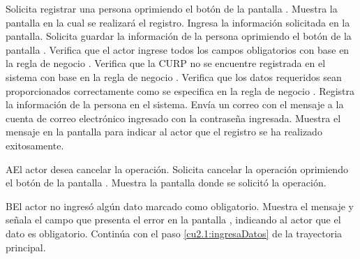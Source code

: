  \begin{UCtrayectoria}
    \UCpaso[\UCactor] Solicita registrar una persona oprimiendo el botón  de la pantalla .
    \UCpaso[\UCsist] Muestra la pantalla  en la cual se realizará el registro. 
    \UCpaso[\UCactor] Ingresa la información solicitada en la pantalla. \label{cu2.1:ingresaDatos}
    \UCpaso[\UCactor] Solicita guardar la información de la persona oprimiendo el botón  de la pantalla .  
    \UCpaso[\UCsist] Verifica que el actor ingrese todos los campos obligatorios con base en la regla de negocio  . 
    \UCpaso[\UCsist] Verifica que la CURP no se encuentre registrada en el sistema con base en la regla de negocio  . 
    \UCpaso[\UCsist] Verifica que los datos requeridos sean proporcionados correctamente como se especifica en la regla de negocio .  
    \UCpaso[\UCsist] Registra la información de la persona en el sistema.
    \UCpaso[\UCsist] Envía un correo con el mensaje  a la cuenta de correo electrónico ingresado con la contraseña ingresada.
    \UCpaso[\UCsist] Muestra el mensaje  en la pantalla 
    para indicar al actor que el registro se ha realizado exitosamente.
 \end{UCtrayectoria}
 \begin{UCtrayectoriaA}{A}{El actor desea cancelar la operación.}
    \UCpaso[\UCactor] Solicita cancelar la operación oprimiendo el botón  de la pantalla .
    \UCpaso[\UCsist] Muestra la pantalla donde se solicitó la operación.
 \end{UCtrayectoriaA} 
 \begin{UCtrayectoriaA}{B}{El actor no ingresó algún dato marcado como obligatorio.}
    \UCpaso[\UCsist] Muestra el mensaje  y señala el campo que presenta el error en la pantalla 
	    , indicando al actor que el dato es obligatorio.
    \UCpaso[] Continúa con el paso \ref{cu2.1:ingresaDatos} de la trayectoria principal.
 \end{UCtrayectoriaA}
